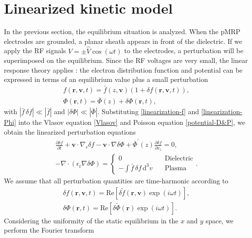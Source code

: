 \documentclass[superscriptaddress,preprint]{revtex4}  %
\renewcommand{\vec}{\mathbf}
\begin{document}
\section{Linearized kinetic model}
In the previous section, the equilibrium situation is analyzed. When the pMRP electrodes are grounded, a planar sheath appears in front of the dielectric. If we apply the RF signals $V=\pm \hat{V} \cos(\omega t)$ to the electrodes, a perturbation will be superimposed on the equilibrium. Since the RF voltages are very small, the linear response theory applies \cite{Krall1973,Buckley1966}: the electron distribution function and potential can be expressed in terms of an equilibrium value plus a small perturbation
\begin{gather}
f(\vec{r},\vec{v},t)=\bar f(z,\vec{v}) \left( 1+\delta\!f(\vec{r},\vec{v},t) \right),
\label{linearization-f}\\
\Phi(\vec{r},t)=\bar \Phi(z)+\delta \Phi(\vec{r},t),
\label{linearization-Phi}
\end{gather}
with $\left| \bar f\,\delta\!f \right| \ll \left| \bar f \right|$ and $\left| \delta\Phi \right| \ll \left| \bar\Phi \right|$. Substituting \eqref{linearization-f} and \eqref{linearization-Phi} into the Vlasov equation \eqref{Vlasov} and Poisson equation \eqref{potential-D&P}, we obtain the linearized perturbation equations
\begin{gather}
\frac{\partial \delta\!f}{\partial t}+\vec{v} \cdot \nabla_r \delta\!f -\vec{v} \cdot \nabla \delta\Phi + \bar\Phi^\prime(z) \frac{\partial \delta\!f}{\partial v_z}=0, 
\label{f1-perturbation}\\
-\nabla \cdot (\epsilon_\mathrm{r} \nabla \delta\Phi)=
\begin{cases}
0                                                 &\text{Dielectric} \\
\displaystyle{-\int \bar f\,\delta\!f\,{\mathrm{d}^3 v}}  \quad &\text{Plasma}  
\end{cases}.
\label{phi1-perturbation}
\end{gather}
We assume that all perturbation quantities are time-harmonic according to
\begin{gather}
\delta\!f(\vec{r},\vec{v},t)=\mathrm{Re}\left[\delta\!\tilde{f}(\vec{r},\vec{v}) \exp(i\omega t)\right],\\
\delta\Phi(\vec{r},t)=\mathrm{Re}\left[\delta\tilde{\Phi}(\vec{r}) \exp(i\omega t)\right].
\end{gather} 
Considering the uniformity of the static equilibrium in the $x$ and $y$ space, we perform the Fourier transform
\end{document}
